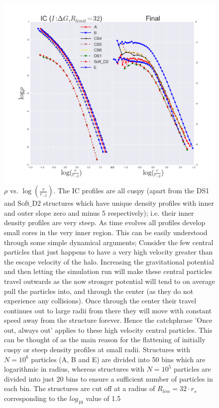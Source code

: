 \begin{figure}[!htbp]
\centering
\includegraphics[width=1.0\linewidth]{img/log_r_r2_rho_IC_Final_R32.png}
\caption{$\rho$ vs. $\log (\frac{r}{r_{-2}})$. The IC profiles are all cuspy (apart from the DS1 and Soft$\_$D2 structures which have unique density profiles with inner and outer slope zero and minus 5 respectively); i.e. their inner density profiles are very steep. As time evolves all profiles develop small cores in the very inner region. This can be easily understood through some simple dynamical arguments; Consider the few central particles that just happens to have a very high velocity greater than the escape velocity of the halo. Increasing the gravitational potential and then letting the simulation run will make these central particles travel outwards as the now stronger potential will tend to on average pull the particles into, and through the center (as they do not experience any collisions). Once through the center their travel continues out to large radii from there they will move with constant speed away from the structure forever. Hence the catchphrase 'Once out, always out' applies to these high velocity central particles. This can be thought of as the main reason for the flattening of initially cuspy or steep density profiles at small radii. Structures with $N = 10^6$ particles (A, B and E) are divided into 50 bins which are logarithmic in radius, whereas structures with $N = 10^5$ particles are divided into just 20 bins to ensure a sufficient number of particles in each bin. The structures are cut off at a radius of $R_{lim} = 32\cdot r_s$ corresponding to the $log_{10}$ value of 1.5}
\label{fig:test}
\end{figure}

